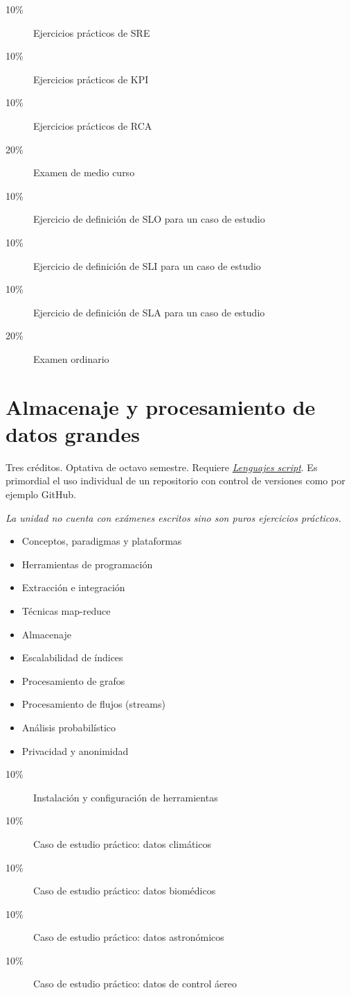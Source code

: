 \documentclass{article}
\begin{document}
\begin{multicols}{4}
\begin{description}
\item[10\%]{Ejercicios pr\'{a}cticos de SRE}
\item[10\%]{Ejercicios pr\'{a}cticos de KPI}
\item[10\%]{Ejercicios pr\'{a}cticos de RCA}    
\item[20\%]{Examen de medio curso}
\item[10\%]{Ejercicio de definici\'{o}n de SLO para un caso de estudio}
\item[10\%]{Ejercicio de definici\'{o}n de SLI para un caso de estudio}
\item[10\%]{Ejercicio de definici\'{o}n de SLA para un caso de estudio}
\item[20\%]{Examen ordinario}
\end{description}  

\vfill\null \columnbreak

\hypertarget{ayp}{\section*{Almacenaje y procesamiento de datos grandes}}

Tres cr\'{e}ditos.  Optativa de octavo semestre. Requiere
\hyperlink{ls}{\em Lenguajes script}. Es primordial el uso individual
de un repositorio con control de versiones como por ejemplo GitHub.

{\em La unidad no cuenta con ex\'{a}menes escritos sino son puros
  ejercicios pr\'{a}cticos.}

\begin{itemize}
\item{Conceptos, paradigmas y plataformas}
\item{Herramientas de programaci\'{o}n}
\item{Extracci\'{o}n e integraci\'{o}n}
\item{T\'{e}cnicas map-reduce}
\item{Almacenaje}
\item{Escalabilidad de \'{i}ndices}
\item{Procesamiento de grafos}
\item{Procesamiento de flujos (streams)}
\item{An\'{a}lisis probabil\'{i}stico}
\item{Privacidad y anonimidad}
\end{itemize}

\begin{description}
\item[10\%]{Instalaci\'{o}n y configuraci\'{o}n de herramientas}
\item[10\%]{Caso de estudio pr\'{a}ctico: datos clim\'{a}ticos}
\item[10\%]{Caso de estudio pr\'{a}ctico: datos biom\'{e}dicos}
\item[10\%]{Caso de estudio pr\'{a}ctico: datos astron\'{o}micos}
\item[10\%]{Caso de estudio pr\'{a}ctico: datos de control \'{a}ereo}


\end{description}
\end{multicols}
\end{document}
